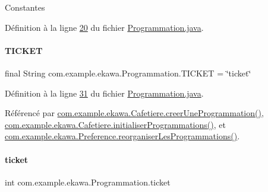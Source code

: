 Constantes 

Définition à la ligne \hyperlink{_programmation_8java_source_l00020}{20} du fichier \hyperlink{_programmation_8java_source}{Programmation.\+java}.

\mbox{\label{classcom_1_1example_1_1ekawa_1_1_programmation_aa04b411478bfe88f8f53057dfca5c650}} 
\paragraph{\texorpdfstring{T\+I\+C\+K\+ET}{TICKET}}
{\footnotesize\ttfamily final String com.\+example.\+ekawa.\+Programmation.\+T\+I\+C\+K\+ET = \char`\"{}ticket\char`\"{}\hspace{0.3cm}{\ttfamily [static]}}



Définition à la ligne \hyperlink{_programmation_8java_source_l00031}{31} du fichier \hyperlink{_programmation_8java_source}{Programmation.\+java}.



Référencé par \hyperlink{_cafetiere_8java_source_l00731}{com.\+example.\+ekawa.\+Cafetiere.\+creer\+Une\+Programmation()}, \hyperlink{_cafetiere_8java_source_l00692}{com.\+example.\+ekawa.\+Cafetiere.\+initialiser\+Programmations()}, et \hyperlink{_preference_8java_source_l00157}{com.\+example.\+ekawa.\+Preference.\+reorganiser\+Les\+Programmations()}.

\mbox{\label{classcom_1_1example_1_1ekawa_1_1_programmation_a54ce49550025f7f5e5080f0548b08653}} 
\paragraph{\texorpdfstring{ticket}{ticket}}
{\footnotesize\ttfamily int com.\+example.\+ekawa.\+Programmation.\+ticket\hspace{0.3cm}{\ttfamily [private]}}



